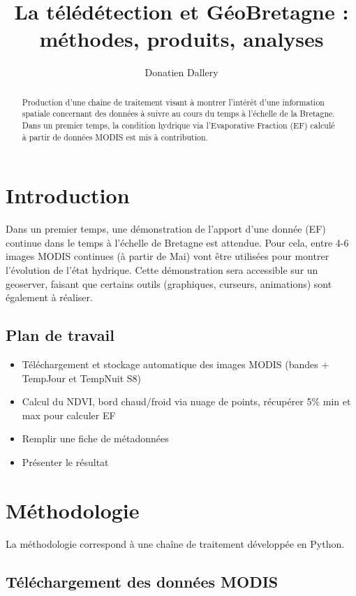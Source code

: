 \documentclass[10pt,a4paper]{article}
\author{Donatien Dallery}
\title{La télédétection et GéoBretagne : méthodes, produits, analyses}
\begin{document}
\maketitle

\begin{abstract}
Production d'une chaîne de traitement visant à montrer l'intérêt d'une information spatiale concernant des données à suivre au cours du temps à l'échelle de la Bretagne. Dans un premier temps, la condition hydrique via l'Evaporative Fraction (EF) calculé à partir de données MODIS est mis à contribution.
\end{abstract}

\section{Introduction}

Dans un premier temps, une démonstration de l'apport d'une donnée (EF) continue dans le temps à l'échelle de Bretagne est attendue. Pour cela, entre 4-6 images MODIS continues (à partir de Mai) vont être utilisées pour montrer l'évolution de l'état hydrique. Cette démonstration sera accessible sur un geoserver, faisant que certains outils (graphiques, curseurs, animations) sont également à réaliser. 

\subsection{Plan de travail}

\begin{itemize}
\item Téléchargement et stockage automatique des images MODIS (bandes + TempJour et TempNuit S8)
\item Calcul du NDVI, bord chaud/froid via nuage de points, récupérer 5\% min et max pour calculer EF
\item Remplir une fiche de métadonnées
\item Présenter le résultat
\end{itemize}

\section{Méthodologie}

La méthodologie correspond à une chaîne de traitement développée en Python.

\subsection{Téléchargement des données MODIS}
\end{document}
